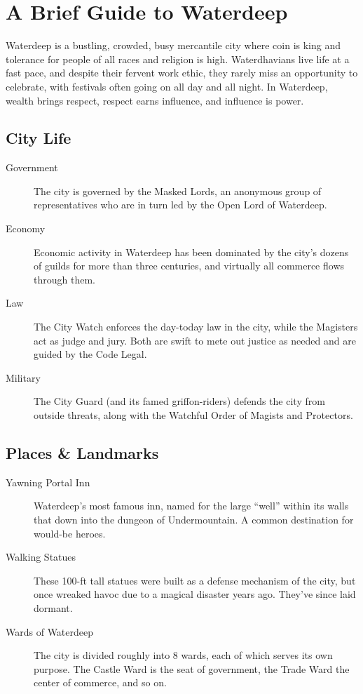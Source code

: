 \documentclass[10pt,twoside,twocolumn,openany,bg=print]{dndbook}
\begin{document}
\pagebreak

\chapter{A Brief Guide to Waterdeep}
Waterdeep is a bustling, crowded, busy mercantile city where coin is king and tolerance for people of all races and religion is high. Waterdhavians live life at a fast pace, and despite their fervent work ethic, they rarely miss an opportunity to celebrate, with festivals often going on all day and all night. In Waterdeep, wealth brings respect, respect earns influence, and influence is power.

\section{City Life}
\begin{description}
\item [Government]
The city is governed by the Masked Lords, an anonymous group of representatives who are in turn led by the Open Lord of Waterdeep.
\item [Economy]
Economic activity in Waterdeep has been dominated by the city’s dozens of guilds for more than three centuries, and virtually all commerce flows through them.
\item [Law]
The City Watch enforces the day-today law in the city, while the Magisters act as judge and jury. Both are swift to mete out justice as needed and are guided by the Code Legal.
\item [Military]
The City Guard (and its famed griffon-riders) defends the city from outside threats, along with the Watchful Order of Magists and Protectors.
\end{description}

\section{Places \& Landmarks}
\begin{description}
\item [Yawning Portal Inn]
Waterdeep’s most famous inn, named for the large “well” within its walls that down into the dungeon of Undermountain. A common destination for would-be heroes.
\item [Walking Statues]
These 100-ft tall statues were built as a defense mechanism of the city, but once wreaked havoc due to a magical disaster years ago. They’ve since laid dormant.
\item [Wards of Waterdeep]
The city is divided roughly into 8 wards, each of which serves its own purpose. The Castle Ward is the seat of government, the Trade Ward the center of commerce, and so on.
\end{description}
\end{document}
